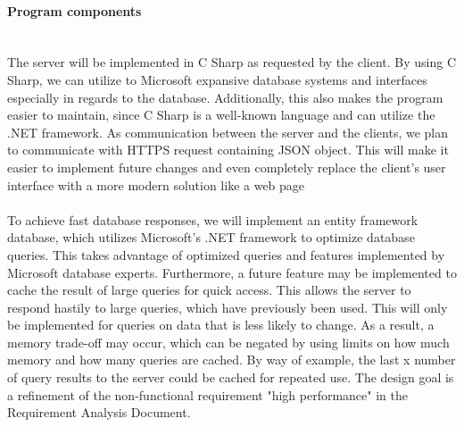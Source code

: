\paragraph{Program components}\mbox{}\\
The server will be implemented in C Sharp as requested by the client. By using C Sharp, we can utilize to Microsoft expansive database systems and interfaces especially in regards to the database. Additionally, this also makes the program easier to maintain, since C Sharp is a well-known language and can utilize the .NET framework. As communication between the server and the clients, we plan to communicate with HTTPS  request containing JSON object. This will make it easier to implement future changes and even completely replace the client's user interface with a more modern solution like a web page
\\\\
To achieve fast database responses, we will implement an entity framework database, which utilizes Microsoft's .NET framework to optimize database queries. This takes advantage of optimized queries and features implemented by Microsoft database experts. Furthermore, a future feature may be implemented to cache the result of large queries for quick access. This allows the server to respond hastily to large queries, which have previously been used. This will only be implemented for queries on data that is less likely to change. As a result, a memory trade-off may occur, which can be negated by using limits on how much memory and how many queries are cached. By way of example, the last x number of query results to the server could be cached for repeated use. The design goal is a refinement of the non-functional requirement "high performance" in the Requirement Analysis Document.
